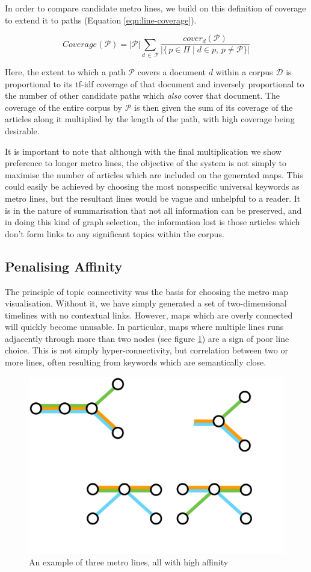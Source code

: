 In order to compare candidate metro lines, we build on this definition of coverage to extend it to paths (Equation \ref{eqn:line-coverage}).

\begin{equation}
	Coverage(\mathcal{P}) = {|\mathcal{P}|}\sum_{d\,\in\,\mathcal{P}}\frac{cover_{d}(\mathcal{P})}{|\{\,p\in{\Pi}\;|\;d \in p,\,p \neq \mathcal{P}\}|}
	\label{eqn:line-coverage}
\end{equation}

Here, the extent to which a path $\mathcal{P}$ covers a document $d$ within a corpus $\mathcal{D}$ is proportional to its tf-idf coverage of that document and inversely proportional to the number of other candidate paths which \textit{also} cover that document. The coverage of the entire corpus by $\mathcal{P}$ is then given the sum of its coverage of the articles along it multiplied by the length of the path, with high coverage being desirable.

It is important to note that although with the final multiplication we show preference to longer metro lines, the objective of the system is not simply to maximise the number of articles which are included on the generated maps. This could easily be achieved by choosing the most nonspecific universal keywords as metro lines, but the resultant lines would be vague and unhelpful to a reader. It is in the nature of summarisation that not all information can be preserved, and in doing this kind of graph selection, the information lost is those articles which don't form links to any significant topics within the corpus.

\subsection{Penalising Affinity} \label{sec:affinity}

The principle of topic connectivity was the basis for choosing the metro map visualisation. Without it, we have simply generated a set of two-dimensional timelines with no contextual links. However, maps which are overly connected will quickly become unusable. In particular, maps where multiple lines runs adjacently through more than two nodes (see figure \ref{fig:lowaffinity}) are a sign of poor line choice. This is not simply hyper-connectivity, but correlation between two or more lines, often resulting from keywords which are semantically close.

\begin{figure}[htbp!]
	\centering
	\includegraphics[width=.3\textwidth]{img/implementation/lowaffinity.pdf}
	\caption{An example of three metro lines, all with high affinity}
	\label{fig:lowaffinity}
\end{figure}

